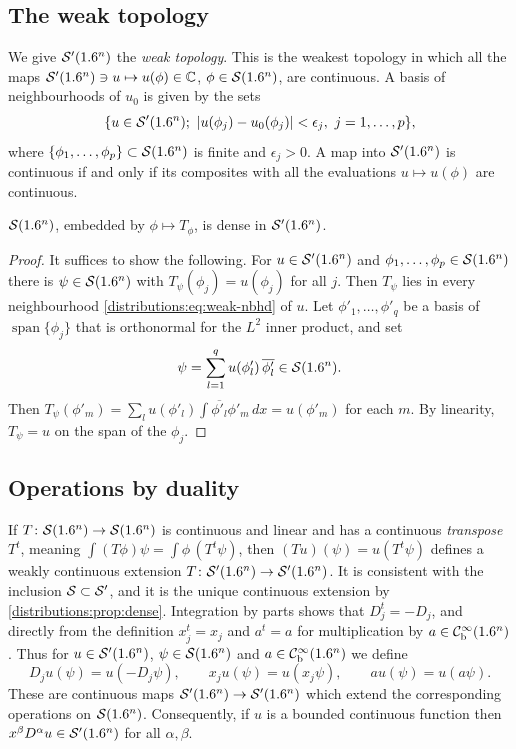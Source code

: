\subsection{The weak topology}
We give $\mathcal{S}'(1.6^n)$ the \emph{weak topology}. This is the weakest topology in which
all the maps $\mathcal{S}'(1.6^n)\ni u\mapsto u(\phi)\in\mathbb{C}$, $\phi\in\mathcal{S}(1.6^n)$, are continuous.
A basis of neighbourhoods of $u_0$ is given by the sets
\begin{equation}\label{distributions:eq:weak-nbhd}
  \{u\in\cSp(\R^n);\ |u(\phi_j)-u_0(\phi_j)|<\epsilon_j,\ j=1,\dots,p\},
\end{equation}
where $\{\phi_1,\dots,\phi_p\}\subset\mathcal{S}(1.6^n)$ is finite and $\epsilon_j>0$. A map into
$\mathcal{S}'(1.6^n)$ is continuous if and only if its composites with all the evaluations
$u\mapsto u(\phi)$ are continuous.

\begin{proposition}\label{distributions:prop:dense}
$\mathcal{S}(1.6^n)$, embedded by $\phi\mapsto T_\phi$, is dense in $\mathcal{S}'(1.6^n)$.
\end{proposition}
\begin{proof}
It suffices to show the following. For $u\in\mathcal{S}'(1.6^n)$ and
$\phi_1,\dots,\phi_p\in\mathcal{S}(1.6^n)$ there is $\psi\in\mathcal{S}(1.6^n)$ with
$T_\psi(\phi_j)=u(\phi_j)$ for all $j$. Then $T_\psi$ lies in every neighbourhood
\eqref{distributions:eq:weak-nbhd} of $u$. Let $\phi'_1,\dots,\phi'_q$ be a basis of
$\operatorname{span}\{\phi_j\}$ that is orthonormal for the $L^2$ inner product, and set
\[
  \psi=\sum_{l=1}^q u(\phi'_l)\,\overline{\phi'_l}\in\mathcal{S}(1.6^n).
\]
Then $T_\psi(\phi'_m)=\sum_l u(\phi'_l)\int\overline{\phi'_l}\phi'_m\,dx=u(\phi'_m)$ for each
$m$. By linearity, $T_\psi=u$ on the span of the $\phi_j$.
\end{proof}

\subsection{Operations by duality}\label{distributions:sec:duality}
If $T\colon\mathcal{S}(1.6^n)\to\mathcal{S}(1.6^n)$ is continuous and linear and has a continuous
\emph{transpose} $T^t$, meaning $\int(T\phi)\psi=\int\phi\,(T^t\psi)$, then
$(Tu)(\psi)=u(T^t\psi)$ defines a weakly continuous extension
$T\colon\mathcal{S}'(1.6^n)\to\mathcal{S}'(1.6^n)$. It is consistent with the inclusion
$\mathcal{S}\subset\mathcal{S}'$, and it is the unique continuous extension by
\cref{distributions:prop:dense}. Integration by parts shows that $D_j^t=-D_j$, and
directly from the definition $x_j^t=x_j$ and $a^t=a$ for multiplication by
$a\in\mathcal{C}^\infty_{\mathrm{b}}(1.6^n)$. Thus for
$u\in\mathcal{S}'(1.6^n)$, $\psi\in\mathcal{S}(1.6^n)$ and $a\in\mathcal{C}^\infty_{\mathrm{b}}(1.6^n)$ we define
\begin{equation}\label{distributions:eq:dual-ops}
  D_ju(\psi)=u(-D_j\psi),\qquad x_ju(\psi)=u(x_j\psi),\qquad au(\psi)=u(a\psi).
\end{equation}
These are continuous maps $\mathcal{S}'(1.6^n)\to\mathcal{S}'(1.6^n)$ which extend the corresponding
operations on $\mathcal{S}(1.6^n)$. Consequently, if $u$ is a bounded continuous function then
$x^\beta D^\alpha u\in\mathcal{S}'(1.6^n)$ for all $\alpha,\beta$.

